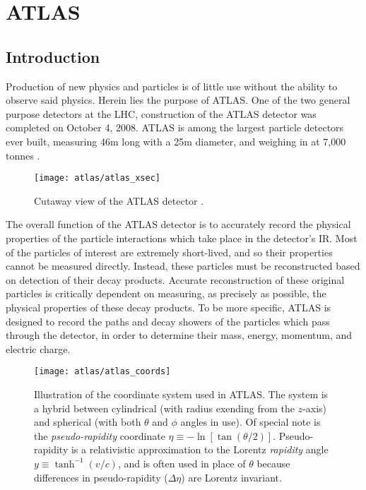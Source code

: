 \chapter{ATLAS} \label{chapter:atlas}

\section{Introduction}

    Production of new physics and particles is of little use without the ability to observe said physics.
    Herein lies the purpose of ATLAS.
    One of the two general purpose detectors at the LHC, construction of the ATLAS detector was completed on October 4, 2008.
    ATLAS is among the largest particle detectors ever built, measuring 46m long with a 25m diameter, and weighing in at 7,000 tonnes \cite{atlas_website}.

    \begin{figure}[h]
        \texttt{[image: atlas/atlas\_xsec]}
        \caption{Cutaway view of the ATLAS detector \cite{Pequenao:1095924}.}
        \label{fig:atlas_xsec}
    \end{figure}


    The overall function of the ATLAS detector is to accurately record the physical properties
        of the particle interactions which take place in the detector's IR.
    Most of the particles of interest are extremely short-lived, and so their properties cannot be measured directly.
    Instead, these particles must be reconstructed based on detection of their decay products.
    Accurate reconstruction of these original particles is critically dependent on measuring, as precisely as possible, the physical properties of these decay products.
    To be more specific, ATLAS is designed to record the paths and decay showers of the particles which pass through the detector, in order to determine their mass, energy, momentum, and electric charge.

    \begin{figure} \centering
        \texttt{[image: atlas/atlas\_coords]}
        \caption{
            Illustration of the coordinate system used in ATLAS\cite{Schott:1699952}.
            The system is a hybrid between cylindrical (with radius exending from the $z$-axis)
                and spherical (with both $\theta$ and $\phi$ angles in use).
            Of special note is the \textit{pseudo-rapidity} coordinate $\eta \equiv -\ln[\tan(\theta/2)]$.
            Pseudo-rapidity is a relativistic approximation to the Lorentz \textit{rapidity} angle $y \equiv \tanh^{-1}(v/c)$,
                and is often used in place of $\theta$ because differences in pseudo-rapidity ($\Delta \eta$) are Lorentz invariant.
        }
        \label{fig:atlas_coords}
    \end{figure}

